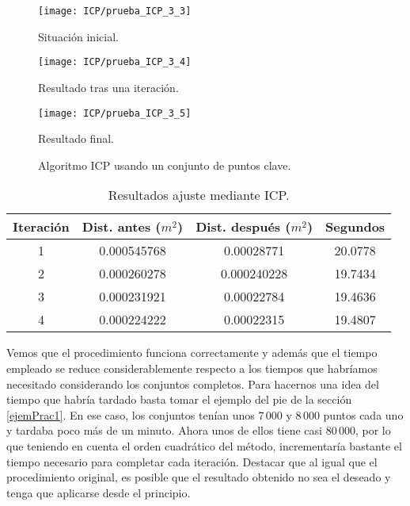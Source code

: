 \begin{figure}[h!]
	\begin{minipage}[b]{0.5\textwidth}
		\centering
		\texttt{[image: ICP/prueba\_ICP\_3\_3]} 
		\caption*{Situación inicial.}
	\end{minipage}
	\begin{minipage}[b]{0.5\textwidth}
		\centering
		\texttt{[image: ICP/prueba\_ICP\_3\_4]}
		\caption*{Resultado tras una iteración.}
	\end{minipage}
	\begin{center}
		\begin{minipage}[b]{0.5\textwidth}
		\centering
		\texttt{[image: ICP/prueba\_ICP\_3\_5]}
		\caption*{Resultado final.}
	\end{minipage}
	\end{center}

	\caption{Algoritmo ICP usando un conjunto de puntos clave.}
	\label{clave1}
\end{figure}

\begin{table}[h!]
	\centering
	\begin{tabular}{| c | c | c | c |} 
		\hline
		Iteración & Dist. antes ($ m^2 $)  & Dist. después ($ m^2 $) & Segundos \\
		\hline
		1 &  0.000545768 &  0.00028771 & 20.0778\\			 
		2 & 0.000260278 & 0.000240228 &   19.7434\\	
		3 & 0.000231921 & 0.00022784  & 19.4636\\
		4 & 0.000224222 &  0.00022315 & 19.4807\\
		\hline
	\end{tabular}
	\caption{Resultados ajuste mediante ICP.}
	\label{table:ICPKPtotal}
\end{table}

Vemos que el procedimiento funciona correctamente y además que el tiempo empleado se reduce considerablemente respecto a los tiempos que habríamos necesitado considerando los conjuntos completos. Para hacernos una idea del tiempo que habría tardado basta tomar el ejemplo del pie de la sección \ref{ejemPrac1}. En ese caso, los conjuntos tenían unos 7\,000 y 8\,000 puntos cada uno y tardaba poco más de un minuto. Ahora unos de ellos tiene casi 80\,000, por lo que teniendo en cuenta el orden cuadrático del método, incrementaría bastante el tiempo necesario para completar cada iteración. Destacar que al igual que el procedimiento original, es posible que el resultado obtenido no sea el deseado y tenga que aplicarse desde el principio.
